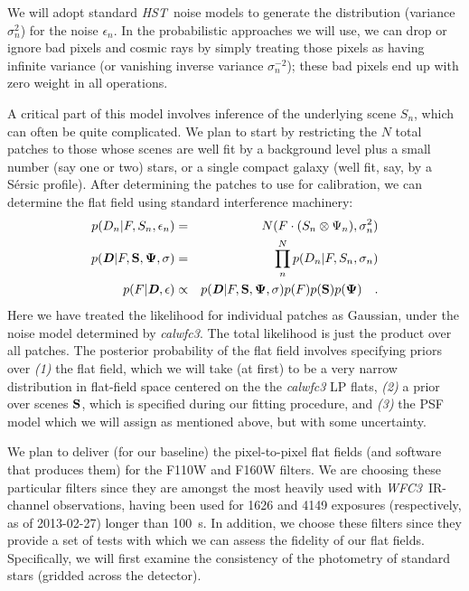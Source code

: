 \documentclass[12pt]{article}
\newcommand{\project}[1]{\textsl{#1}}
\newcommand{\HST}{\project{HST}}
\newcommand{\WFC}{\project{WFC3}}
\newcommand{\bvec}[1]{\textbf{\textit{#1}}}
\begin{document}
We will adopt standard \HST\ noise models to generate the distribution
(variance $\sigma_n^2$) for the noise $\epsilon_n$.  In the
probabilistic approaches we will use, we can drop or ignore bad pixels
and cosmic rays by simply treating those pixels as having infinite
variance (or vanishing inverse variance $\sigma_n^{-2}$); these bad
pixels end up with zero weight in all operations.

A critical part of this model involves inference of the underlying
scene $S_n$, which can often be quite complicated.  We plan to start by restricting the $N$ total patches to those whose
scenes are well fit by a background level plus a small number (say one or two) stars, or a single compact
galaxy (well fit, say, by a S\'{e}rsic profile).  After determining
the patches to use for calibration, we can determine the flat field
using standard interference machinery:
\begin{eqnarray}
p(D_n|F,S_n,\epsilon_n) &=& N(F \cdot (S_n \otimes \Psi_n), \sigma_n^2)
\\
p(\bvec{D}|F,{\bf S},{\bf \Psi},{\bf \sigma}) &=& \prod_n^N
p(D_n|F,S_n,\sigma_n) \\
p(F|\bvec{D},{\bf \epsilon}) & \propto & p(\bvec{D}|F,{\bf S},{\bf \Psi},{\bf
  \sigma}) p(F) p({\bf S}) p({\bf \Psi})
\quad .
\end{eqnarray}
Here we have treated the likelihood for individual patches as Gaussian, under the
noise model determined by \textsl{calwfc3}.  The total likelihood is
just the product over all patches.  The posterior probability of the
flat field involves specifying priors over \textsl{(1)} the flat
field, which we will take (at first) to be a very narrow distribution
in flat-field space centered on the the \textsl{calwfc3} LP flats, \textsl{(2)} a prior over scenes ${\bf S}$, which
is specified during our fitting procedure, and \textsl{(3)} the PSF model
which we will assign as mentioned above, but with some uncertainty.

We plan to deliver (for our baseline) the pixel-to-pixel flat fields
(and software that produces them) for the F110W and F160W filters.  We
are choosing these particular filters since they are amongst the most
heavily used with \WFC\ IR-channel observations, having been used for
1626 and 4149 exposures (respectively, as of 2013-02-27) longer than
100~s.  In addition, we choose these filters since they provide a set
of tests with which we can assess the fidelity of our flat fields.
Specifically, we will first examine the consistency of the photometry
of standard stars (gridded across the detector).
\end{document}

